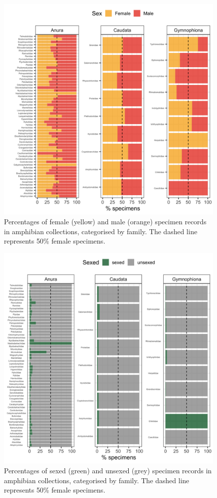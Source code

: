 \documentclass[a4paper, 12pt]{article}
\begin{document}
\begin{figure}[H]
 \centering
  \includegraphics[width = \linewidth]{figures/all-family-amphibians.png}
  \caption{Percentages of female (yellow) and male (orange) specimen records in amphibian collections, categorised by family.
  The dashed line represents 50\% female specimens.}
  \label{fig-amphibian-family}
\end{figure}

\begin{figure}[H]
 \centering
  \includegraphics[width = \linewidth]{figures/all-unsexed-family-amphibians.png}
  \caption{Percentages of sexed (green) and unsexed (grey) specimen records in amphibian collections, categorised by family.
  The dashed line represents 50\% female specimens.}
  \label{fig-amphibian-family-unsexed}
\end{figure}
\end{document}
